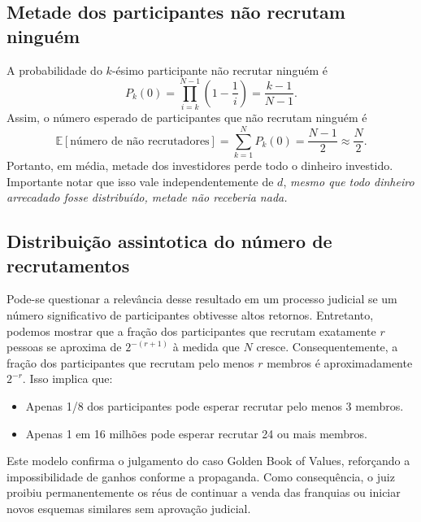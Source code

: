 \documentclass[a4paper,12pt]{article}
\begin{document}
\subsection*{Metade dos participantes não recrutam ninguém}

A probabilidade do $k$-ésimo participante não recrutar ninguém é
\[
  P_k(0) = \prod_{i=k}^{N-1} \left(1 - \frac{1}{i}\right) =
  \frac{k-1}{N-1}.
\]
Assim, o número esperado de participantes que não recrutam ninguém é
\[
  \mathbb E[\text{número de não recrutadores}] = \sum_{k=1}^{N} P_k(0)
  = \frac{N-1}{2} \approx \frac{N}{2}.
\]
Portanto, em média, metade dos investidores perde todo o dinheiro
investido. Importante notar que isso vale independentemente de $d$,
\emph{mesmo que todo dinheiro arrecadado fosse distribuído, metade não
  receberia nada.}

\subsection*{Distribuição assintotica do número de recrutamentos}

Pode-se questionar a relevância desse resultado em um processo judicial
se um número significativo de participantes obtivesse altos
retornos. Entretanto, podemos mostrar que a fração dos participantes
que recrutam exatamente $r$ pessoas se aproxima de $2^{-(r+1)}$ à
medida que $N$ cresce. Consequentemente, a fração dos participantes que
recrutam pelo menos $r$ membros é aproximadamente $2^{-r}$. Isso
implica que:
\begin{itemize}[noitemsep]
\item Apenas 1/8 dos participantes pode esperar recrutar pelo menos 3
  membros.
\item Apenas 1 em 16 milhões pode esperar recrutar 24 ou mais membros.
\end{itemize}

Este modelo confirma o julgamento do caso Golden Book of Values,
reforçando a impossibilidade de ganhos conforme a propaganda. Como
consequência, o juiz proibiu permanentemente os réus de continuar a
venda das franquias ou iniciar novos esquemas similares sem aprovação
judicial.
\end{document}
